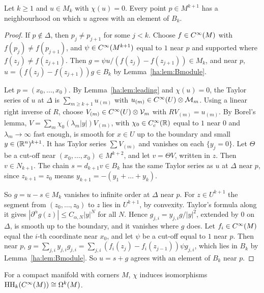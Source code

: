 \begin{lemma}\label{ha:lem:local}
Let \(k\ge1\) and \(u\in M_k\) with \(\chi(u)=0\). Every point \(p\in
M^{k+1}\) has a neighbourhood on which \(u\) agrees with an element of
\(B_k\).
\end{lemma}

\begin{proof}
If \(p\notin\Delta\), then \(p_j\ne p_{j+1}\) for some \(j<k\). Choose
\(f\in C^\infty(M)\) with \(f(p_j)\ne f(p_{j+1})\), and \(\psi\in C^\infty(M^{k+1})\)
equal to \(1\) near \(p\) and supported where \(f(z_j)\ne f(z_{j+1})\).
Then \(g=\psi u/(f(z_j)-f(z_{j+1}))\in M_k\), and near \(p\),
\(u=(f(z_j)-f(z_{j+1}))g\in B_k\) by Lemma~\ref{ha:lem:Bmodule}.

Let \(p=(x_0,\dots,x_0)\). By Lemma~\ref{ha:lem:leading} and \(\chi(u)=0\),
the Taylor series of \(u\) at \(\Delta\) is \(\sum_{m\ge k+1}u_{(m)}\) with
\(u_{(m)}\in C^\infty(U)\otimes\mathcal M_m\). Using a linear right inverse of
\(R\), choose \(V_{(m)}\in C^\infty(U)\otimes\mathcal V_m\) with
\(RV_{(m)}=u_{(m)}\). By Borel's lemma, \(V=\sum_m\chi_0(\lambda_m|y|)
V_{(m)}\), with \(\chi_0\in C^\infty_c(\mathbb R)\) equal to \(1\) near \(0\) and
\(\lambda_m\to\infty\) fast enough, is smooth for \(x\in U\) up to the
boundary and small \(y\in(\mathbb R^n)^{k+1}\). It has Taylor series
\(\sum V_{(m)}\) and vanishes on each \(\{y_j=0\}\). Let \(\Theta\) be a
cut-off near \((x_0,\dots,x_0)\in M^{k+2}\), and let \(v=\Theta V\),
written in \(z\). Then \(v\in N_{k+1}\). The chain \(s=d_{k+1}v\in B_k\)
has the same Taylor series as \(u\) at \(\Delta\) near \(p\), since
\(z_{k+1}=z_0\) means \(y_{k+1}=-(y_1+\dots+y_k)\).

So \(g=u-s\in M_k\) vanishes to infinite order at \(\Delta\) near \(p\).
For \(z\in U^{k+1}\) the segment from \((z_0,\dots,z_0)\) to \(z\) lies in
\(U^{k+1}\), by convexity. Taylor's formula along it gives
\(|\partial^\alpha g(z)|\le C_{\alpha,N}|y|^N\) for all \(N\). Hence
\(g_{j,i}=y_{j,i}g/|y|^2\), extended by \(0\) on \(\Delta\), is smooth up
to the boundary, and it vanishes where \(g\) does. Let \(f_i\in C^\infty(M)\)
equal the \(i\)-th coordinate near \(x_0\), and let \(\psi\) be a cut-off
equal to \(1\) near \(p\). Then near \(p\),
\(g=\sum_{j,i}y_{j,i}g_{j,i}=\sum_{j,i}(f_i(z_j)-f_i(z_{j-1}))\psi
g_{j,i}\), which lies in \(B_k\) by Lemma~\ref{ha:lem:Bmodule}. So
\(u=s+g\) agrees with an element of \(B_k\) near \(p\).
\end{proof}

\begin{theorem}[Connes, (B5)]\label{ha:thm:connes}
For a compact manifold with corners \(M\), \(\chi\) induces isomorphisms
\(\operatorname{HH}_k(C^\infty(M))\cong\Omega^k(M)\).
\end{theorem}


